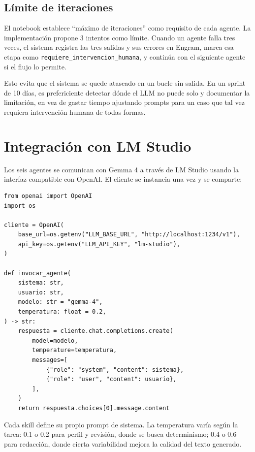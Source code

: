 \documentclass[12pt, a4paper]{article}
\begin{document}
\subsection{Límite de iteraciones}

El notebook establece ``máximo de iteraciones'' como requisito de cada
agente. La implementación propone 3 intentos como límite. Cuando un agente
falla tres veces, el sistema registra las tres salidas y sus errores en
Engram, marca esa etapa como \texttt{requiere\_intervencion\_humana}, y
continúa con el siguiente agente si el flujo lo permite.

Esto evita que el sistema se quede atascado en un bucle sin salida. En un
sprint de 10 días, es prefericiente detectar dónde el LLM no puede solo
y documentar la limitación, en vez de gastar tiempo ajustando prompts
para un caso que tal vez requiera intervención humana de todas formas.

\section{Integración con LM Studio}

Los seis agentes se comunican con Gemma 4 a través de LM Studio usando
la interfaz compatible con OpenAI. El cliente se instancia una vez y se
comparte:

\begin{lstlisting}[style=python]
from openai import OpenAI
import os

cliente = OpenAI(
    base_url=os.getenv("LLM_BASE_URL", "http://localhost:1234/v1"),
    api_key=os.getenv("LLM_API_KEY", "lm-studio"),
)

def invocar_agente(
    sistema: str,
    usuario: str,
    modelo: str = "gemma-4",
    temperatura: float = 0.2,
) -> str:
    respuesta = cliente.chat.completions.create(
        model=modelo,
        temperature=temperatura,
        messages=[
            {"role": "system", "content": sistema},
            {"role": "user", "content": usuario},
        ],
    )
    return respuesta.choices[0].message.content
\end{lstlisting}

Cada skill define su propio prompt de sistema. La temperatura varía
según la tarea: 0.1 o 0.2 para perfil y revisión, donde se busca
determinismo; 0.4 o 0.6 para redacción, donde cierta variabilidad
mejora la calidad del texto generado.
\end{document}
